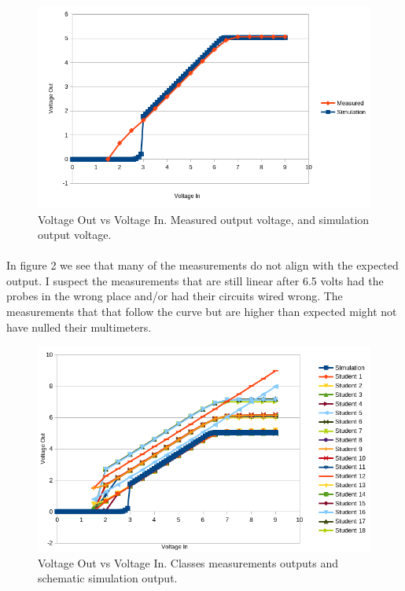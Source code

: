 \documentclass{article}
\begin{document}
\begin{figure}[H]
	\begin{center}
		\includegraphics[width=\textwidth]{measured_chart.png}
	\end{center}
	\caption{Voltage Out vs Voltage In. Measured output voltage, and simulation output voltage.}
\end{figure}

\paragraph{}
In figure 2 we see that many of the measurements do not align with the expected output. I suspect the measurements that are still linear after 6.5 volts had the probes in the wrong place and/or had their circuits wired wrong. The measurements that that follow the curve but are higher than expected might not have nulled their multimeters.

\begin{figure}[H]
	\begin{center}
		\includegraphics[width=\textwidth]{class_chart.png}
	\end{center}
	\caption{Voltage Out vs Voltage In. Classes measurements outputs and schematic simulation output.}
\end{figure}
\end{document}
